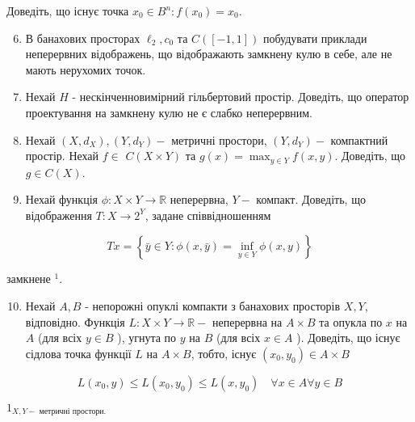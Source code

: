 \documentclass[10pt]{article}
\begin{document}
Доведіть, що існує точка $x_{0} \in B^{n}: f\left(x_{0}\right)=x_{0}$.

\begin{enumerate}
  \setcounter{enumi}{5}
  \item В банахових просторах $\ell_{2}, c_{0}$ та $C([-1,1])$ побудувати приклади неперервних відображень, що відображають замкнену кулю в себе, але не мають нерухомих точок.

  \item Нехай $H$ - нескінченновимірний гільбертовий простір. Доведіть, що оператор проектування на замкнену кулю не є слабко неперервним.

  \item Нехай $\left(X, d_{X}\right),\left(Y, d_{Y}\right)-$ метричні простори, $\left(Y, d_{Y}\right)-$ компактний простір. Нехай $f \in$ $C(X \times Y)$ та $g(x)=\max _{y \in Y} f(x, y)$. Доведіть, що $g \in C(X)$.

  \item Нехай функція $\phi: X \times Y \rightarrow \mathbb{R}$ неперервна, $Y-$ компакт. Доведіть, що відображення $T: X \rightarrow 2^{Y}$, задане співвідношенням

\end{enumerate}

$$
T x=\left\{\bar{y} \in Y: \phi(x, \bar{y})=\inf _{y \in Y} \phi(x, y)\right\}
$$

замкнене ${ }^{1}$.

\begin{enumerate}
  \setcounter{enumi}{9}
  \item Нехай $A, B$ - непорожні опуклі компакти з банахових просторів $X, Y$, відповідно. Функція $L: X \times Y \rightarrow \mathbb{R}-$ неперервна на $A \times B$ та опукла по $x$ на $A$ (для всіх $y \in B$ ), угнута по $y$ на $B$ (для всіх $x \in A$ ). Доведіть, що існує сідлова точка функції $L$ на $A \times B$, тобто, існує $\left(x_{0}, y_{0}\right) \in A \times B$
\end{enumerate}

$$
L\left(x_{0}, y\right) \leq L\left(x_{0}, y_{0}\right) \leq L\left(x, y_{0}\right) \quad \forall x \in A \forall y \in B
$$

$1_{X, Y-\text { метричні простори. }}$
\end{document}
